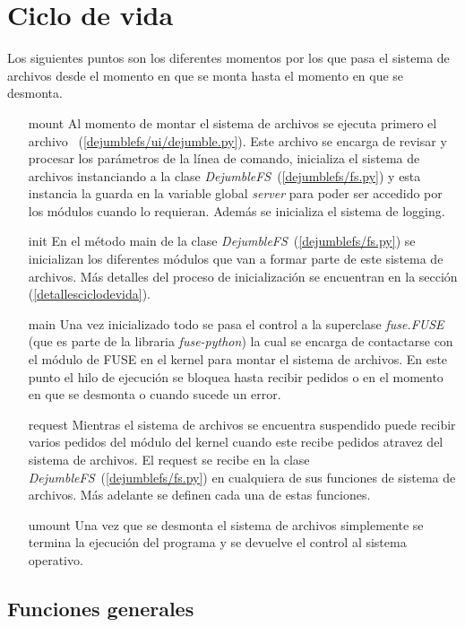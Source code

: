 \section{Ciclo de vida}

Los siguientes puntos son los diferentes momentos por los que pasa el sistema de archivos desde el momento en que se monta hasta el momento en que se desmonta.

\begin{itemize}
\item[mount] Al momento de montar el sistema de archivos se ejecuta primero el archivo ~(\ref{dejumblefs/ui/dejumble.py}). Este archivo se encarga de revisar y procesar los parámetros de la línea de comando, inicializa el sistema de archivos instanciando a la clase \textit{DejumbleFS}~(\ref{dejumblefs/fs.py}) y esta instancia la guarda en la variable global \textit{server} para poder ser accedido por los módulos cuando lo requieran. Además se inicializa el sistema de logging.
\item[init] En el método main de la clase \textit{DejumbleFS}~(\ref{dejumblefs/fs.py}) se inicializan los diferentes módulos que van a formar parte de este sistema de archivos. Más detalles del proceso de inicialización se encuentran en la sección (\ref{detallesciclodevida}).
\item[main] Una vez inicializado todo se pasa el control a la superclase \textit{fuse.FUSE} (que es parte de la libraria \textit{fuse-python}) la cual se encarga de contactarse con el módulo de FUSE en el kernel para montar el sistema de archivos. En este punto el hilo de ejecución se bloquea hasta recibir pedidos o en el momento en que se desmonta o cuando sucede un error.
\item[request] Mientras el sistema de archivos se encuentra suspendido puede recibir varios pedidos del módulo del kernel cuando este recibe pedidos atravez del sistema de archivos. El request se recibe en la clase \textit{DejumbleFS}~(\ref{dejumblefs/fs.py}) en cualquiera de sus funciones de sistema de archivos. Más adelante se definen cada una de estas funciones.
\item[umount] Una vez que se desmonta el sistema de archivos simplemente se termina la ejecución del programa y se devuelve el control al sistema operativo.
\end{itemize}

\subsection{Funciones generales}

